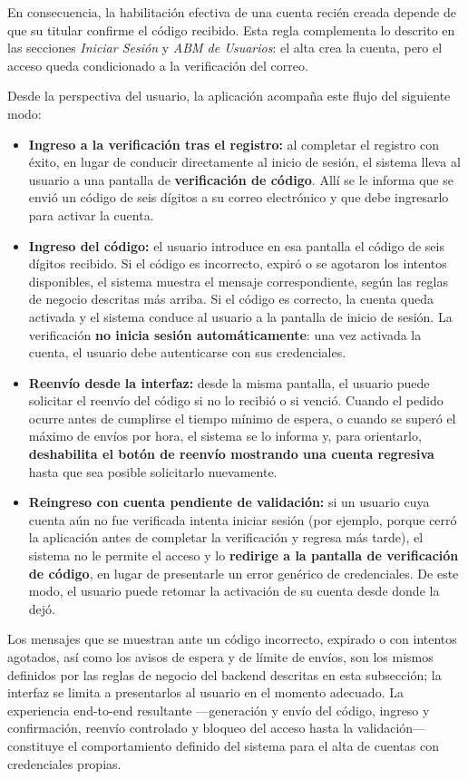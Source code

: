 \documentclass[a4paper,12pt]{article}
\begin{document}
    \par En consecuencia, la habilitación efectiva de una cuenta recién creada depende de que su titular confirme el código recibido. Esta regla complementa lo descrito en las secciones \textit{Iniciar Sesión} y \textit{ABM de Usuarios}: el alta crea la cuenta, pero el acceso queda condicionado a la verificación del correo.
    \par Desde la perspectiva del usuario, la aplicación acompaña este flujo del siguiente modo:
    \begin{itemize}
        \item \textbf{Ingreso a la verificación tras el registro:} al completar el registro con éxito, en lugar de conducir directamente al inicio de sesión, el sistema lleva al usuario a una pantalla de \textbf{verificación de código}. Allí se le informa que se envió un código de seis dígitos a su correo electrónico y que debe ingresarlo para activar la cuenta.
        \item \textbf{Ingreso del código:} el usuario introduce en esa pantalla el código de seis dígitos recibido. Si el código es incorrecto, expiró o se agotaron los intentos disponibles, el sistema muestra el mensaje correspondiente, según las reglas de negocio descritas más arriba. Si el código es correcto, la cuenta queda activada y el sistema conduce al usuario a la pantalla de inicio de sesión. La verificación \textbf{no inicia sesión automáticamente}: una vez activada la cuenta, el usuario debe autenticarse con sus credenciales.
        \item \textbf{Reenvío desde la interfaz:} desde la misma pantalla, el usuario puede solicitar el reenvío del código si no lo recibió o si venció. Cuando el pedido ocurre antes de cumplirse el tiempo mínimo de espera, o cuando se superó el máximo de envíos por hora, el sistema se lo informa y, para orientarlo, \textbf{deshabilita el botón de reenvío mostrando una cuenta regresiva} hasta que sea posible solicitarlo nuevamente.
        \item \textbf{Reingreso con cuenta pendiente de validación:} si un usuario cuya cuenta aún no fue verificada intenta iniciar sesión (por ejemplo, porque cerró la aplicación antes de completar la verificación y regresa más tarde), el sistema no le permite el acceso y lo \textbf{redirige a la pantalla de verificación de código}, en lugar de presentarle un error genérico de credenciales. De este modo, el usuario puede retomar la activación de su cuenta desde donde la dejó.
    \end{itemize}
    \par Los mensajes que se muestran ante un código incorrecto, expirado o con intentos agotados, así como los avisos de espera y de límite de envíos, son los mismos definidos por las reglas de negocio del backend descritas en esta subsección; la interfaz se limita a presentarlos al usuario en el momento adecuado. La experiencia end-to-end resultante ---generación y envío del código, ingreso y confirmación, reenvío controlado y bloqueo del acceso hasta la validación--- constituye el comportamiento definido del sistema para el alta de cuentas con credenciales propias.
\end{document}
